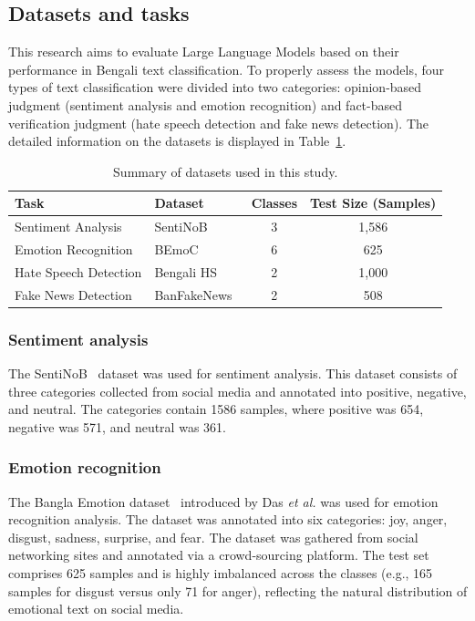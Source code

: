 \documentclass[10pt,letterpaper]{article}
\begin{document}
\subsection*{Datasets and tasks}
This research aims to evaluate Large Language Models based on their performance in Bengali text classification. To properly assess the models, four types of text classification were divided into two categories: opinion-based judgment (sentiment analysis and emotion recognition) and fact-based verification judgment (hate speech detection and fake news detection). The detailed information on the datasets is displayed in Table~\ref{tab:datasets}.

\begin{table}[!t]
\centering
\small
\caption{Summary of datasets used in this study.}
\label{tab:datasets}
\renewcommand{\arraystretch}{1.2}
\setlength{\tabcolsep}{6pt}
\begin{tabularx}{\columnwidth}{|l|X|c|c|}
\hline
\textbf{Task} & \textbf{Dataset} & \textbf{Classes} & \textbf{Test Size (Samples)} \\\hline
Sentiment Analysis & SentiNoB~\cite{b31} & 3 & 1,586 \\\hline
Emotion Recognition & BEmoC~\cite{b32} & 6 & 625 \\\hline
Hate Speech Detection & Bengali HS~\cite{b33} & 2 & 1,000 \\\hline
Fake News Detection & BanFakeNews~\cite{b34} & 2 & 508 \\\hline
\end{tabularx}
\end{table}



\subsubsection*{Sentiment analysis}
The SentiNoB~\cite{b31} dataset was used for sentiment analysis. This dataset consists of three categories collected from social media and annotated into positive, negative, and neutral. The categories contain 1586 samples, where positive was 654, negative was 571, and neutral was 361.


\subsubsection*{Emotion recognition}
The Bangla Emotion dataset~\cite{b32} introduced by Das \textit{et al.} was used for emotion recognition analysis. The dataset was annotated into six categories: joy, anger, disgust, sadness, surprise, and fear. The dataset was gathered from social networking sites and annotated via a crowd-sourcing platform. The test set comprises 625 samples and is highly imbalanced across the classes (e.g., 165 samples for disgust versus only 71 for anger), reflecting the natural distribution of emotional text on social media.
\end{document}
